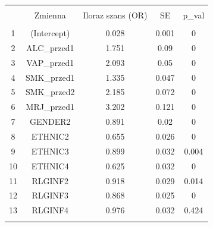 
\begin{tabular}{@{\extracolsep{5pt}} ccccc} 
\\[-1.8ex]\hline 
\hline \\[-1.8ex] 
 & Zmienna & Iloraz szans (OR) & SE & p\_val \\ 
\hline \\[-1.8ex] 
1 & (Intercept) & 0.028 & 0.001 & 0 \\ 
2 & ALC\_przed1 & 1.751 & 0.09 & 0 \\ 
3 & VAP\_przed1 & 2.093 & 0.05 & 0 \\ 
4 & SMK\_przed1 & 1.335 & 0.047 & 0 \\ 
5 & SMK\_przed2 & 2.185 & 0.072 & 0 \\ 
6 & MRJ\_przed1 & 3.202 & 0.121 & 0 \\ 
7 & GENDER2 & 0.891 & 0.02 & 0 \\ 
8 & ETHNIC2 & 0.655 & 0.026 & 0 \\ 
9 & ETHNIC3 & 0.899 & 0.032 & 0.004 \\ 
10 & ETHNIC4 & 0.625 & 0.032 & 0 \\ 
11 & RLGINF2 & 0.918 & 0.029 & 0.014 \\ 
12 & RLGINF3 & 0.868 & 0.025 & 0 \\ 
13 & RLGINF4 & 0.976 & 0.032 & 0.424 \\ 
\hline \\[-1.8ex] 
\end{tabular} 

